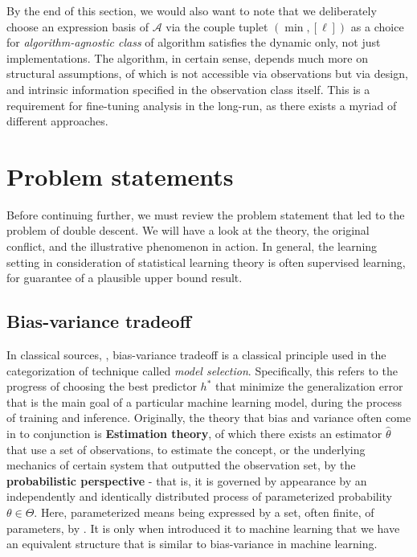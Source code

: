 \documentclass[10pt]{article} %
\begin{document}
By the end of this section, we would also want to note that we deliberately choose an expression basis of $\mathcal{A}$ via the couple tuplet $(\min, [\ell])$ as a choice for \textit{algorithm-agnostic class} of algorithm satisfies the dynamic only, not just implementations. The algorithm, in certain sense, depends much more on structural assumptions, of which is not accessible via observations but via design, and intrinsic information specified in the observation class itself. This is a requirement for fine-tuning analysis in the long-run, as there exists a myriad of different approaches. 
\section{Problem statements}

Before continuing further, we must review the problem statement that led to the problem of double descent. We will have a look at the theory, the original conflict, and the illustrative phenomenon in action. In general, the learning setting in consideration of statistical learning theory is often supervised learning, for guarantee of a plausible upper bound result. 

\subsection{Bias-variance tradeoff}

In classical sources, \cite{gareth_james_introduction_2013,goodfellow2016deep,STL_Hajek_Maxim_2021,10.5555/2371238,10.5555/2621980}, bias-variance tradeoff is a classical principle used in the categorization of technique called \textit{model selection}. Specifically, this refers to the progress of choosing the best predictor $h^{*}$ that minimize the generalization error that is the main goal of a particular machine learning model, during the process of training and inference. Originally, the theory that bias and variance often come in to conjunction is \textbf{Estimation theory}, of which there exists an estimator $\hat{\theta}$ that use a set of observations, to estimate the concept, or the underlying mechanics of certain system that outputted the observation set, by the \textbf{probabilistic perspective} - that is, it is governed by appearance by an independently and identically distributed process of parameterized probability $\theta\in \Theta$. Here, parameterized means being expressed by a set, often finite, of parameters, by \cite{LehmannCasella_theory_1998,liam_statistics_2005}. It is only when \cite{6797087} introduced it to machine learning that we have an equivalent structure that is similar to bias-variance in machine learning. 
\end{document}
